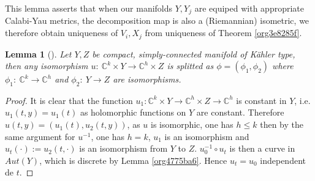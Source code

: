 \documentclass[11pt]{article}
\newtheorem{lemma}[theorem]{Lemma}
\begin{document}
This lemma asserts that when our manifolds \(Y, Y_j\) are equiped with appropriate Calabi-Yau metrics,
the decomposition map is also a (Riemannian) isometric, we therefore obtain uniqueness of \(V_i, X_j\)
from uniqueness of Theorem \ref{org3e8285f}.

\begin{lemma}[]
Let \(Y,Z\) be compact, simply-connected manifold of Kähler type, then any isomorphism \(u:\
\mathbb{C}^k\times Y\longrightarrow \mathbb{C}^h\times Z\) is splitted as \(\phi = (\phi_1,\phi_2)\)
where \(\phi_1:\ \mathbb{C}^k\longrightarrow \mathbb{C}^h\) and \(\phi_2:\ Y\longrightarrow Z\) are
isomorphisms.
\end{lemma}
\begin{proof}
It is clear that the function \(u_1: \mathbb{C}^k\times Y \longrightarrow \mathbb{C}^h \times Z
\longrightarrow \mathbb{C}^h\) is constant in \(Y\), i.e. \(u_1(t,y) = u_1(t)\) as holomorphic
functions on \(Y\) are constant. Therefore  \(u(t,y) = (u_1(t), u_2(t,y))\), as \(u\) is isomorphic, one
has \(h\leq k\) then by the same argument for \(u^{-1}\), one has \(h=k\), \(u_1\) is an isomorphism and
\(u_t(\cdot) := u_2(t,\cdot)\) is an isomorphism from \(Y\) to \(Z\). \(u_0^{-1}\circ u_t\) is then a curve in
\(Aut(Y)\), which is discrete by Lemma \ref{org4775ba6}. Hence \(u_t= u_0\) independent de \(t\).
\end{proof}
\end{document}
